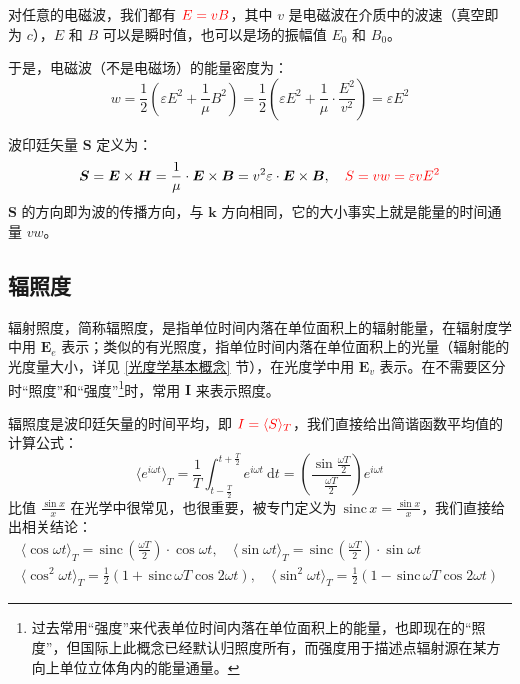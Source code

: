 \documentclass[UTF8]{report}
\def\sinc{\mathrm{\,sinc}\,}
\theoremstyle{MyLineTheoremStyle} %
\theoremstyle{MyBlockTheoremStyle} %
\theoremstyle{MySubsubsectionStyle} %
\begin{document}
对任意的电磁波，我们都有 $\displaystyle {\color{red} E = vB}$，其中 $v$ 是电磁波在介质中的波速（真空即为 $c$），$E$ 和 $B$ 可以是瞬时值，也可以是场的振幅值 $E_0$ 和 $B_0$。

于是，电磁波（不是电磁场）的能量密度为：
\begin{equation}
    w = \frac{1}{2}\left( \varepsilon E^2 + \frac{1}{\mu}B^2 \right) =  \frac{1}{2}\left( \varepsilon E^2 + \frac{1}{\mu}\cdot \frac{E^2}{v^2} \right) = \varepsilon E^2
\end{equation}



波印廷矢量 $\boldsymbol{S}$ 定义为：
\begin{equation}
\boldsymbol{S}
= \boldsymbol{E} \times \boldsymbol{H} 
= \frac{1}{\mu} \cdot\boldsymbol{E} \times \boldsymbol{B} 
= v^2 \varepsilon \cdot \boldsymbol{E} \times \boldsymbol{B},\quad {\color{red} S = vw = \varepsilon v E^2}
\end{equation}
$\boldsymbol{S}$ 的方向即为波的传播方向，与 $\boldsymbol{k}$ 方向相同，它的大小事实上就是能量的时间通量 $vw$。
\subsection{辐照度}

辐射照度，简称辐照度，是指单位时间内落在单位面积上的辐射能量，在辐射度学中用 $\boldsymbol{E}_e$ 表示；类似的有光照度，指单位时间内落在单位面积上的光量（辐射能的光度量大小，详见 \ref{光度学基本概念} 节），在光度学中用 $\boldsymbol{E}_v$ 表示。在不需要区分时“照度”和“强度”\footnote{过去常用“强度”来代表单位时间内落在单位面积上的能量，也即现在的“照度”，但国际上此概念已经默认归照度所有，而强度用于描述点辐射源在某方向上单位立体角内的能量通量。}时，常用 $\boldsymbol{I}$ 来表示照度。

辐照度是波印廷矢量的时间平均，即 ${\color{red} I = \langle S  \rangle_T}$，我们直接给出简谐函数平均值的计算公式：
\begin{equation}
\langle e^{i \omega t} \rangle_T = \frac{1}{T}\int_{t - \frac{T}{2}}^{t + \frac{T}{2}} e^{i \omega t} \ \mathrm{d}t = \left(\frac{\sin \frac{\omega T}{2}}{\frac{\omega T}{2}}\right)e^{i \omega t}
\end{equation}
比值 $\frac{\sin x}{x}$ 在光学中很常见，也很重要，被专门定义为 $\sinc x = \frac{\sin x}{x}$，我们直接给出相关结论：
\begin{gather}
    \langle \cos \omega t \rangle_T  = \sinc \left(\frac{\omega T}{2}  \right)\cdot \cos \omega t, \quad \langle \sin \omega t \rangle_T  = \sinc \left(\frac{\omega T}{2} \right)\cdot \sin \omega t \\ 
    \langle \cos^2 \omega t \rangle_T  = \frac{1}{2}\left(1 + \sinc \omega T  \cos 2 \omega t\right), \quad \langle \sin^2 \omega t \rangle_T  = \frac{1}{2}\left(1 - \sinc \omega T  \cos 2 \omega t\right)
\end{gather}
\end{document}
